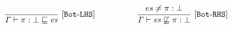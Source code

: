  \begin{gather*}
  \codeme{\frac{
\begin{matrix}
\end{matrix}
}{\text{\code{ \Gamma  \vdash \pi : \bott   \CONTAIN \es }}}\ [Bot\text{-}LHS]}
\qquad\qquad\quad
\codeme{\frac{
\begin{matrix}
\es \neq  \pi : \bott 
\end{matrix}
}{\text{\code{\Gamma  \vdash  \es \not\CONTAIN  \pi : \bott }}} \ \codeme{  [Bot\text{-}RHS]} }
\end{gather*}